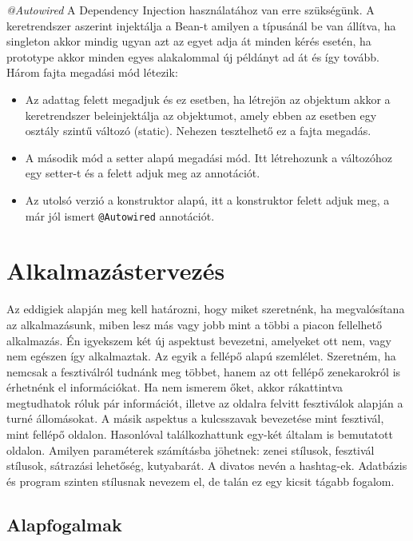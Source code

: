 \textit{@Autowired}
A Dependency Injection használatához van erre szükségünk. A keretrendszer aszerint injektálja a Bean-t amilyen a típusánál be van állítva, ha singleton akkor mindig ugyan azt az egyet adja át minden kérés esetén, ha prototype akkor minden egyes alakalommal új példányt ad át és így tovább.
Három fajta megadási mód létezik:
\begin{itemize}
\item Az adattag felett megadjuk és ez esetben, ha létrejön az objektum akkor a keretrendszer beleinjektálja az objektumot, amely ebben az esetben egy osztály szintű változó (static). Nehezen tesztelhető ez a fajta megadás.

\item A második mód a setter alapú megadási mód. Itt létrehozunk a változóhoz egy setter-t és a felett adjuk meg az annotációt.

\item Az utolsó verzió a konstruktor alapú, itt a konstruktor felett adjuk meg, a már jól ismert \texttt{@Autowired} annotációt.
\end{itemize}

\section{Alkalmazástervezés}

Az eddigiek alapján meg kell határozni, hogy miket szeretnénk, ha megvalósítana az alkalmazásunk, miben lesz más vagy jobb mint a többi a piacon fellelhető alkalmazás. Én igyekszem két új aspektust bevezetni, amelyeket ott nem, vagy nem egészen így alkalmaztak. Az egyik a fellépő alapú szemlélet. Szeretném, ha nemcsak a fesztiválról tudnánk meg többet, hanem az ott fellépő zenekarokról is érhetnénk el információkat. Ha nem ismerem őket, akkor rákattintva megtudhatok róluk pár információt, illetve az oldalra felvitt fesztiválok alapján a turné állomásokat. A másik aspektus a kulcsszavak bevezetése mint fesztivál, mint fellépő oldalon. Hasonlóval találkozhattunk egy-két általam is bemutatott oldalon. Amilyen paraméterek számításba jöhetnek: zenei stílusok, fesztivál stílusok, sátrazási lehetőség, kutyabarát. A divatos nevén a hashtag-ek. Adatbázis és program szinten stílusnak nevezem el, de talán ez egy kicsit tágabb fogalom.

\subsection{Alapfogalmak}

